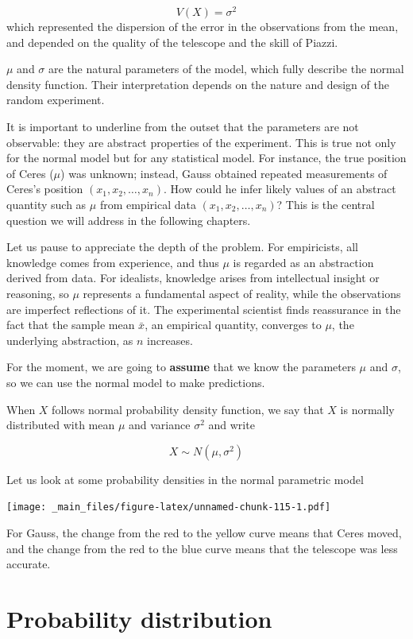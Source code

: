 \documentclass[
]{book}
\begin{document}
\[V(X) = \sigma^2\]
which represented the dispersion of the error in the observations from the mean, and depended on the quality of the telescope and the skill of Piazzi.

\(\mu\) and \(\sigma\) are the natural parameters of the model, which fully describe the normal density function. Their interpretation depends on the nature and design of the random experiment.

It is important to underline from the outset that the parameters are not observable: they are abstract properties of the experiment. This is true not only for the normal model but for any statistical model. For instance, the true position of Ceres (\(\mu\)) was unknown; instead, Gauss obtained repeated measurements of Ceres's position \((x_1, x_2, \dots, x_n)\). How could he infer likely values of an abstract quantity such as \(\mu\) from empirical data \((x_1, x_2, \dots, x_n)\)? This is the central question we will address in the following chapters.

Let us pause to appreciate the depth of the problem. For empiricists, all knowledge comes from experience, and thus \(\mu\) is regarded as an abstraction derived from data. For idealists, knowledge arises from intellectual insight or reasoning, so \(\mu\) represents a fundamental aspect of reality, while the observations are imperfect reflections of it. The experimental scientist finds reassurance in the fact that the sample mean \(\bar{x}\), an empirical quantity, converges to \(\mu\), the underlying abstraction, as \(n\) increases.

For the moment, we are going to \textbf{assume} that we know the parameters \(\mu\) and \(\sigma\), so we can use the normal model to make predictions.

When \(X\) follows normal probability density function, we say that \(X\) is normally distributed with mean \(\mu\) and variance \(\sigma^2\) and write

\[X \sim N(\mu, \sigma^2) \]

Let us look at some probability densities in the normal parametric model

\texttt{[image: \_main\_files/figure-latex/unnamed-chunk-115-1.pdf]}

For Gauss, the change from the red to the yellow curve means that Ceres moved, and the change from the red to the blue curve means that the telescope was less accurate.

\hypertarget{probability-distribution-2}{%
\section{Probability distribution}\label{probability-distribution-2}}
\end{document}
